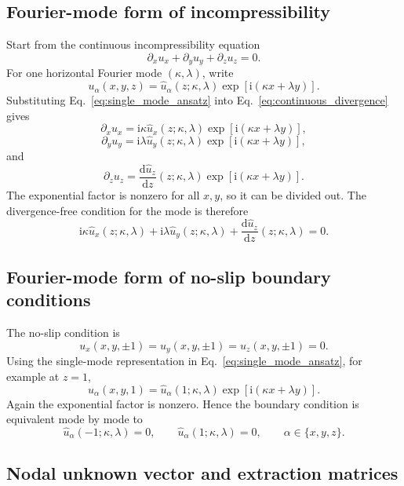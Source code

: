 \documentclass[11pt]{article}
\newcommand{\ii}{\mathrm{i}}
\newcommand{\dd}{\mathrm{d}}
\begin{document}
\subsection{Fourier-mode form of incompressibility}

Start from the continuous incompressibility equation
\[
  \partial_x u_x + \partial_y u_y + \partial_z u_z = 0.
\]
For one horizontal Fourier mode \((\kappa,\lambda)\), write
\begin{equation}
  u_\alpha(x,y,z)
  =
  \widehat{u}_\alpha(z;\kappa,\lambda)
  \exp[\ii(\kappa x+\lambda y)].
  \label{eq:single_mode_ansatz}
\end{equation}
Substituting Eq.~\eqref{eq:single_mode_ansatz} into
Eq.~\eqref{eq:continuous_divergence} gives
\[
  \partial_x u_x
  =
  \ii\kappa\widehat{u}_x(z;\kappa,\lambda)
  \exp[\ii(\kappa x+\lambda y)],
\]
\[
  \partial_y u_y
  =
  \ii\lambda\widehat{u}_y(z;\kappa,\lambda)
  \exp[\ii(\kappa x+\lambda y)],
\]
and
\[
  \partial_z u_z
  =
  \frac{\dd \widehat{u}_z}{\dd z}(z;\kappa,\lambda)
  \exp[\ii(\kappa x+\lambda y)].
\]
The exponential factor is nonzero for all \(x,y\), so it can be divided out.
The divergence-free condition for the mode is therefore
\begin{equation}
  \ii\kappa\widehat{u}_x(z;\kappa,\lambda)
  + \ii\lambda\widehat{u}_y(z;\kappa,\lambda)
  + \frac{\dd \widehat{u}_z}{\dd z}(z;\kappa,\lambda)
  = 0.
  \label{eq:modal_divergence}
\end{equation}

\subsection{Fourier-mode form of no-slip boundary conditions}

The no-slip condition is
\[
  u_x(x,y,\pm1)=u_y(x,y,\pm1)=u_z(x,y,\pm1)=0.
\]
Using the single-mode representation in Eq.~\eqref{eq:single_mode_ansatz},
for example at \(z=1\),
\[
  u_\alpha(x,y,1)
  =
  \widehat{u}_\alpha(1;\kappa,\lambda)
  \exp[\ii(\kappa x+\lambda y)].
\]
Again the exponential factor is nonzero. Hence the boundary condition is
equivalent mode by mode to
\begin{equation}
  \widehat{u}_\alpha(-1;\kappa,\lambda)=0,\qquad
  \widehat{u}_\alpha(1;\kappa,\lambda)=0,
  \qquad \alpha\in\{x,y,z\}.
  \label{eq:modal_noslip}
\end{equation}

\subsection{Nodal unknown vector and extraction matrices}
\end{document}
